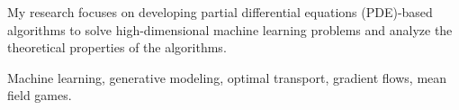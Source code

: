 

\begin{cvparagraph}


My research focuses on developing partial differential equations (PDE)-based algorithms to solve high-dimensional machine learning problems and analyze the theoretical properties of the algorithms.

Machine learning, generative modeling, optimal transport, gradient flows, mean field games.

\end{cvparagraph}